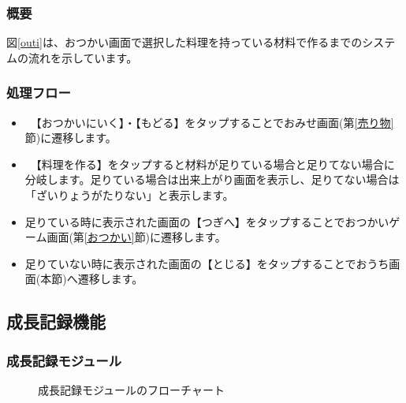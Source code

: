 \documentclass[a4j]{jarticle}
\begin{document}
\subsubsection*{概要}
図\ref{outi}は、おつかい画面で選択した料理を持っている材料で作るまでのシステムの流れを示しています。

\subsubsection*{処理フロー}
\begin{itemize}
\item　【おつかいにいく】・【もどる】をタップすることでおみせ画面(第\ref{売り物}節)に遷移します。
\item　【料理を作る】をタップすると材料が足りている場合と足りてない場合に分岐します。足りている場合は出来上がり画面を表示し、足りてない場合は「ざいりょうがたりない」と表示します。
\item 足りている時に表示された画面の【つぎへ】をタップすることでおつかいゲーム画面(第\ref{おつかい}節)に遷移します。
\item 足りていない時に表示された画面の【とじる】をタップすることでおうち画面(本節)へ遷移します。
\end{itemize}


\subsection{成長記録機能}
\subsubsection{成長記録モジュール\label{grow}}
\begin{figure}[H]
    \begin{center}
    \caption {成長記録モジュールのフローチャート}
    \label{growall}
    \end{center}
\end{figure}
\end{document}
